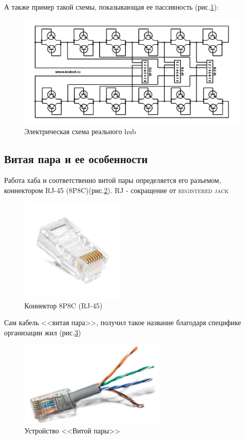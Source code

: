 \documentclass[a4paper]{article}
\begin{document}
А также пример такой схемы, показывающая ее пассивность (рис.\ref{fig:pic-17-ethernet-hub-schema}):
\begin{figure}[!h]
	\centering
	\includegraphics[width=\textwidth]{17-ethernet-hub-schema}
	\caption{Электрическая схема реального hub}
	\label{fig:pic-17-ethernet-hub-schema}
\end{figure}

\subsection{Витая пара и ее особенности}
Работа хаба и соответственно витой пары определяется его разъемом, коннектором RJ-45 (8P8C)(рис.\ref{fig:pic-18-ethernet-rj-45}). RJ - сокращение от \textsc{registered jack}
\begin{figure}[!h]
	\centering
	\includegraphics[width=5cm]{18-ethernet-rj-45}
	\caption{Коннектор 8P8C (RJ-45)}
	\label{fig:pic-18-ethernet-rj-45}
\end{figure}

Сам кабель <<витая пара>>, получил такое название благодаря специфике организации жил (рис.\ref{fig:pic-19-ethernet-twisted-pair})
\begin{figure}[!h]
	\centering
	\includegraphics[width=7cm]{19-ethernet-twisted-pair}
	\caption{Устройство <<Витой пары>>}
	\label{fig:pic-19-ethernet-twisted-pair}
\end{figure}
\end{document}
